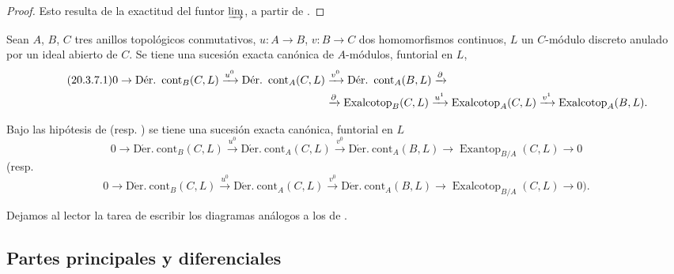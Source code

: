 \begin{proof}
Esto resulta de la exactitud del funtor $\varinjlim$, a partir de
.
\end{proof}

\begin{corollary}[20.3.7]
\label{0.20.3.7-fr}
Sean $A$, $B$, $C$ tres anillos topológicos conmutativos, $u:A\to B$,
$v:B\to C$ dos homomorfismos continuos, $L$ un $C$-módulo discreto anulado
por un ideal abierto de $C$. Se tiene una sucesión exacta canónica de $A$-módulos,
funtorial en $L$,
\begin{align}
\tag{20.3.7.1}
\label{0.20.3.7.1-fr}
  0\to\operatorname{D\acute{e}r.\ cont}_B(C,L)\xrightarrow{u^0}
  \operatorname{D\acute{e}r.\ cont}_A(C,L)&\xrightarrow{v^0}
  \operatorname{D\acute{e}r.\ cont}_A(B,L)\xrightarrow{\partial} \\
  &\xrightarrow{\partial}\operatorname{Exalcotop}_B(C,L)\xrightarrow{u^1}
  \operatorname{Exalcotop}_A(C,L)\xrightarrow{v^1}
  \operatorname{Exalcotop}_A(B,L). \notag
\end{align}
\end{corollary}

\begin{corollary}[20.3.8]
\label{0.20.3.8-fr}
Bajo las hipótesis de  \textup{(resp.}
) se tiene una sucesión exacta canónica, funtorial en $L$
\begin{equation}
\tag{20.3.8.1}
\label{0.20.3.8.1-fr}
  0\to\operatorname{D\acute{e}r.\ cont}_B(C,L)\xrightarrow{u^0}
  \operatorname{D\acute{e}r.\ cont}_A(C,L)\xrightarrow{v^0}
  \operatorname{D\acute{e}r.\ cont}_A(B,L)\to
  \operatorname{Exantop}_{B/A}(C,L)\to0
\end{equation}
\textup{(resp.}
\begin{equation}
\tag{20.3.8.2}
\label{0.20.3.8.2-fr}
  0\to\operatorname{D\acute{e}r.\ cont}_B(C,L)\xrightarrow{u^0}
  \operatorname{D\acute{e}r.\ cont}_A(C,L)\xrightarrow{v^0}
  \operatorname{D\acute{e}r.\ cont}_A(B,L)\to
  \operatorname{Exalcotop}_{B/A}(C,L)\to0\text{).}
\end{equation}
\end{corollary}

Dejamos al lector la tarea de escribir los diagramas análogos a los de
.

\subsection{Partes principales y diferenciales}
\label{subsection:0.20.4-fr}

